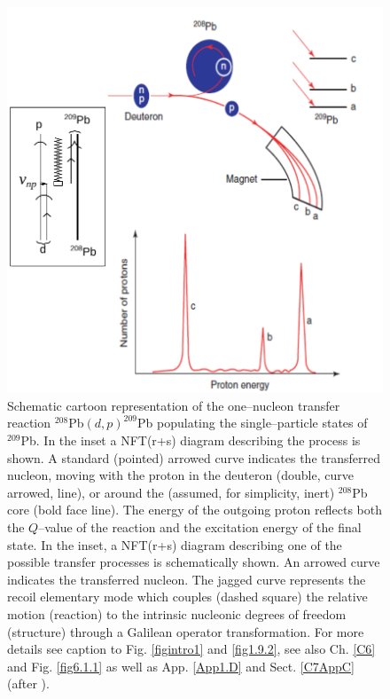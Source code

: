 \begin{figure}
\centerline {
\includegraphics*[width=12cm]{introduccion/figs/figintro2}
}
\caption{Schematic cartoon representation of the one--nucleon transfer reaction $^{208}$Pb$(d,p)^{209}$Pb populating the single--particle states of $^{209}$Pb. In the inset a NFT(r+s) diagram describing the process is shown. A standard (pointed) arrowed curve indicates the transferred nucleon, moving with the proton in the deuteron (double, curve arrowed, line), or around the (assumed, for simplicity, inert) $^{208}$Pb core (bold face line). The energy of the outgoing proton reflects both the $Q$--value of the reaction and the excitation energy of the final state. In the inset, a NFT(r+s) diagram describing one of the possible transfer  processes is schematically shown. An arrowed curve indicates the transferred nucleon. The jagged curve represents the recoil elementary mode which couples (dashed square) the relative motion (reaction) to the intrinsic nucleonic degrees of freedom  (structure) through a Galilean operator transformation. For more details see caption to Fig. \ref{figintro1} and \ref{fig1.9.2}, see also Ch. \ref{C6} and Fig. \ref{fig6.1.1} as well as App. \ref{App1.D} and Sect. \ref{C7AppC} (after \cite{Mottelson:76b}).}
\label{figintro2}
\end{figure}
